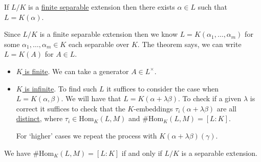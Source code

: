 \documentclass[12pt, a4paper]{article}
\begin{document}
\begin{mdthm}
    If \(L/K\) is a \ul{finite separable} extension then there exists \(\alpha \in L\) such that \(L=K(\alpha)\).
\end{mdthm}

\begin{mdnote}
    Since \(L/K\) is a finite separable extension then we know \(L =K(\alpha_1,\ldots,\alpha_m)\) for some \(\alpha_1,\ldots,\alpha_m \in K\) each separable over \(K\). The theorem says, we can write \(L = K(A)\) for \(A \in L\). 
    \begin{itemize}
        \item \ul{\(K\) is finite}. We can take a generator \(A \in L^{\times}\).
        \item \ul{\(K\) is infinite}. To find such \(L\) it suffices to consider the case when \(L = K(\alpha,\beta)\). We will have that \(L = K(\alpha+\lambda\beta)\). To check if a given \(\lambda\) is correct it suffices to check that the \(K\)-embeddings \(\tau_i(\alpha+\lambda\beta)\) are all \ul{distinct}, where \(\tau_i \in \text{Hom}_K(L,M)\) and \(\#\text{Hom}_K(L,M) = [L:K]\).

        For `higher' cases we repeat the process with \(K(\alpha+\lambda\beta)(\gamma)\).
    \end{itemize}
\end{mdnote}

\begin{mdnote}
    We have \(\#\text{Hom}_K(L,M) = [L:K]\) if and only if \(L/K\) is a separable extension.
\end{mdnote}
\end{document}

